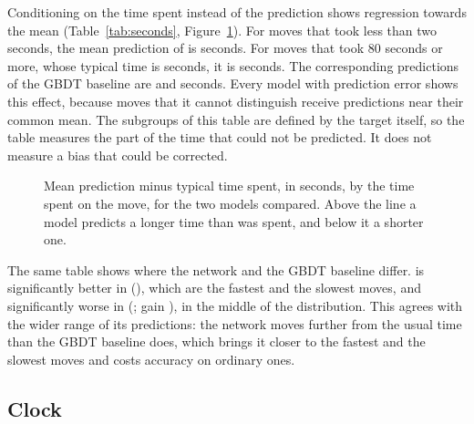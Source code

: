 \documentclass[11pt]{article}
\begin{document}
Conditioning on the time spent instead of the prediction shows regression
towards the mean (Table~\ref{tab:seconds}, Figure~\ref{fig:seconds-bias}).
For moves that took less than two seconds, the mean prediction of
 is  seconds. For
moves that took 80 seconds or more, whose typical time is
 seconds, it is
 seconds. The corresponding predictions
of the GBDT baseline are  and
 seconds. Every model with prediction
error shows this effect, because moves that it cannot distinguish receive
predictions near their common mean. The subgroups of this table are defined
by the target itself, so the table measures the part of the time that could
not be predicted. It does not measure a bias that could be corrected.

\begin{table}[htbp]\centering\footnotesize
{}
\caption{Test-set results by the time spent on the move, in seconds. For each
group: the number of test positions, the typical time spent, the mean
prediction and MAE of each of the two models, and the paired gain of the
first model over the second.}
\label{tab:seconds}
\end{table}

\begin{figure}[htbp]\centering
{}
\caption{Mean prediction minus typical time spent, in seconds, by the time
spent on the move, for the two models compared. Above the line a model
predicts a longer time than was spent, and below it a shorter one.}
\label{fig:seconds-bias}
\end{figure}

The same table shows where the network and the GBDT baseline differ.
 is significantly better in 
(), which are the fastest and the slowest
moves, and significantly worse in 
(; gain ), in the
middle of the distribution. This agrees with the wider range of its
predictions: the network moves further from the usual time than the GBDT
baseline does, which brings it closer to the fastest and the slowest moves
and costs accuracy on ordinary ones.

\subsection{Clock}
\end{document}
